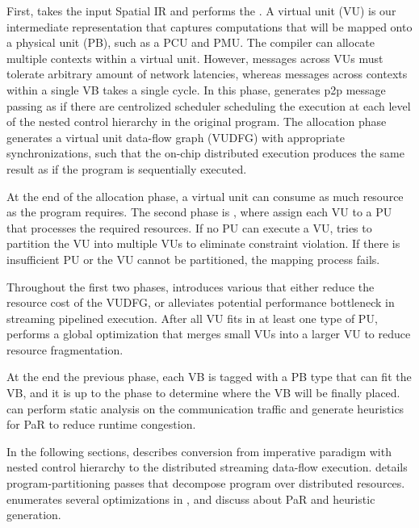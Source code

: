 First, \name takes the input Spatial IR and performs the .
A virtual unit (VU) is our intermediate representation that captures computations that will be
mapped onto a physical unit (PB), such as a PCU and PMU.
The compiler can allocate multiple contexts within a virtual unit. However, messages across 
VUs must tolerate arbitrary amount of network latencies, whereas messages across contexts within a single VB
takes a single cycle.
In this phase, \name generates p2p message passing as if there are centrolized scheduler scheduling
the execution at each level of the nested control hierarchy in the original program.
The allocation phase generates a virtual unit data-flow graph (VUDFG) with appropriate
synchronizations, such that the on-chip distributed execution produces the same result as if the program is
sequentially executed.

At the end of the allocation phase, a virtual unit can consume as much resource as the program
requires. The second phase is , where \name assign each VU to a
PU that processes the required resources. If no PU can execute a VU, \name tries to partition the
VU into multiple VUs to eliminate constraint violation. If there is insufficient PU or the
VU cannot be partitioned, the mapping process fails.

Throughout the first two phases, \name introduces various  that either reduce the
resource cost of the VUDFG, or alleviates potential performance bottleneck in streaming pipelined execution.
After all VU fits in at least one type of PU, \name performs a global optimization that merges 
small VUs into a larger VU to reduce resource fragmentation.

At the end the previous phase, each VB is tagged with a PB type that can fit the VB, and it is up to the
 phase to determine where the VB will be finally placed.
\name can perform static analysis on the communication traffic and generate heuristics for PaR to
reduce runtime congestion.

In the following sections,  describes conversion from imperative paradigm with
nested control hierarchy to the distributed streaming data-flow execution.
 details program-partitioning passes that decompose program over distributed resources.
 enumerates several optimizations in \name, and  discuss about PaR and
heuristic generation.

